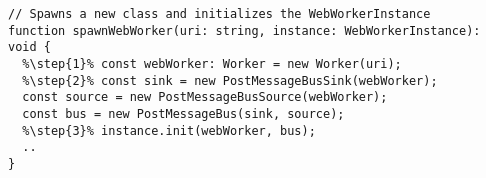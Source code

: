 \begin{verbatim}
// Spawns a new class and initializes the WebWorkerInstance
function spawnWebWorker(uri: string, instance: WebWorkerInstance): void {
  %\step{1}% const webWorker: Worker = new Worker(uri);
  %\step{2}% const sink = new PostMessageBusSink(webWorker);
  const source = new PostMessageBusSource(webWorker);
  const bus = new PostMessageBus(sink, source);
  %\step{3}% instance.init(webWorker, bus);
  ..
}
\end{verbatim}
